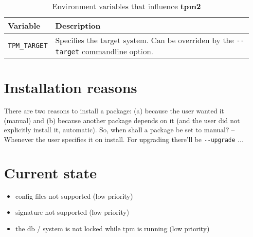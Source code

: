 \documentclass[a4paper]{scrartcl}
\newcommand{\program}[1]{\textbf{#1}}
\begin{document}
	\begin{table}[ht]
		\centering
		
		\begin{tabularx}{.9\textwidth}{l|X}
			Variable & Description \\
			\hline
			\texttt{TPM\_TARGET} & Specifies the target system. Can be overriden by the \texttt{-{}-target} commandline option. \\
		\end{tabularx}
	
		\caption{Environment variables that influence \program{tpm2}}
		\label{tab:environment_variables_for_tpm2}
	\end{table}


	\section{Installation reasons}
	\label{sec:installation_reasons}
	
	There are two reasons to install a package: (a) because the user wanted it (manual) and (b) because another package depends on it (and the user did not explicitly install it, automatic). So, when shall a package be set to manual? -- Whenever the user specifies it on install. For upgrading there'll be \texttt{-{}-upgrade} ...






	\section{Current state}
	\label{sec:current_state}
	
	\begin{itemize}
		\item config files not supported (low priority)
		\item signature not supported (low priority)
		\item the db / system is not locked while tpm is running (low priority)
	\end{itemize}
	
\end{document}
